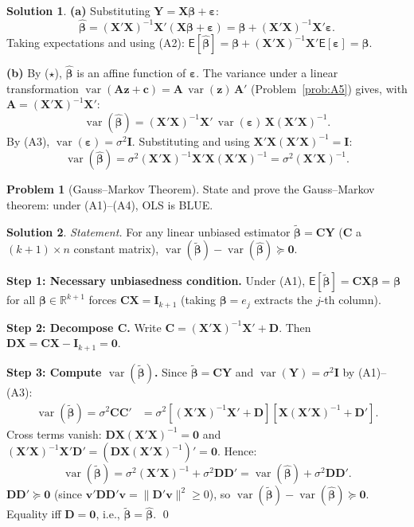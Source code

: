 \documentclass[12pt,a4paper]{article}
\theoremstyle{definition}
\newtheorem{exercise}{Problem}
\newtheorem*{solution*}{Solution}
\newcommand\expc{\mathsf{E}}
\DeclareMathOperator\var{var}
\newcommand{\bX}{\mathbf{X}}
\newcommand{\bY}{\mathbf{Y}}
\def\bb{\boldsymbol{\beta}}
\newcommand{\be}{\boldsymbol{\varepsilon}}
\newcommand{\bI}{\mathbf{I}}
\def\bc{\mathbf{c}}
\newcommand{\bzero}{\mathbf{0}}
\newcommand{\bz}{\mathbf{z}}
\newcommand{\bA}{\mathbf{A}}
\newcommand{\bC}{\mathbf{C}}
\newcommand{\bD}{\mathbf{D}}
\newcommand{\bv}{\mathbf{v}}
\newcommand{\Real}{\mathbb{R}}
\begin{document}
\begin{solution*}
\textbf{(a)} Substituting $\bY = \bX\bb + \be$:
\[
\hat{\bb} = (\bX'\bX)^{-1}\bX'(\bX\bb + \be) = \bb + (\bX'\bX)^{-1}\bX'\be. \tag{$\star$}
\]
Taking expectations and using (A2): $\expc[\hat{\bb}] = \bb + (\bX'\bX)^{-1}\bX'\expc[\be] = \bb$.

\textbf{(b)} By ($\star$), $\hat{\bb}$ is an affine function of $\be$. The variance under a linear transformation $\var(\bA\bz + \bc) = \bA\,\var(\bz)\,\bA'$ (Problem~\ref{prob:A5}) gives, with $\bA = (\bX'\bX)^{-1}\bX'$:
\[
\var(\hat{\bb}) = (\bX'\bX)^{-1}\bX'\,\var(\be)\,\bX(\bX'\bX)^{-1}.
\]
By (A3), $\var(\be) = \sigma^2\bI$. Substituting and using $\bX'\bX(\bX'\bX)^{-1} = \bI$:
\[
\var(\hat{\bb}) = \sigma^2(\bX'\bX)^{-1}\bX'\bX(\bX'\bX)^{-1} = \sigma^2(\bX'\bX)^{-1}. \tag*{\qed}
\]
\end{solution*}

\begin{exercise}[Gauss--Markov Theorem]\label{prob:A7}
State and prove the Gauss--Markov theorem: under (A1)--(A4), OLS is BLUE.
\end{exercise}

\begin{solution*}
\emph{Statement.} For any linear unbiased estimator $\tilde{\bb} = \bC\bY$ ($\bC$ a $(k+1)\times n$ constant matrix), $\var(\tilde{\bb}) - \var(\hat{\bb}) \succeq \bzero$.

\textbf{Step 1: Necessary unbiasedness condition.} Under (A1), $\expc[\tilde{\bb}] = \bC\bX\bb = \bb$ for all $\bb \in \Real^{k+1}$ forces $\bC\bX = \bI_{k+1}$ (taking $\bb = e_j$ extracts the $j$-th column).

\textbf{Step 2: Decompose $\bC$.} Write $\bC = (\bX'\bX)^{-1}\bX' + \bD$. Then $\bD\bX = \bC\bX - \bI_{k+1} = \bzero$.

\textbf{Step 3: Compute $\var(\tilde{\bb})$.} Since $\tilde{\bb} = \bC\bY$ and $\var(\bY) = \sigma^2\bI$ by (A1)--(A3):
\begin{align*}
\var(\tilde{\bb}) = \sigma^2\bC\bC' &= \sigma^2[(\bX'\bX)^{-1}\bX' + \bD][\bX(\bX'\bX)^{-1} + \bD'].
\end{align*}
Cross terms vanish: $\bD\bX(\bX'\bX)^{-1} = \bzero$ and $(\bX'\bX)^{-1}\bX'\bD' = (\bD\bX(\bX'\bX)^{-1})' = \bzero$. Hence:
\[
\var(\tilde{\bb}) = \sigma^2(\bX'\bX)^{-1} + \sigma^2\bD\bD' = \var(\hat{\bb}) + \sigma^2\bD\bD'.
\]
$\bD\bD' \succeq \bzero$ (since $\bv'\bD\bD'\bv = \|\bD'\bv\|^2 \geqslant 0$), so $\var(\tilde{\bb}) - \var(\hat{\bb}) \succeq \bzero$. Equality iff $\bD = \bzero$, i.e., $\tilde{\bb} = \hat{\bb}$. \qed
\end{solution*}
\end{document}
